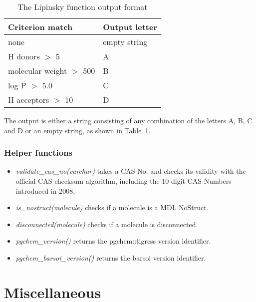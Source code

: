 \documentclass[a4paper]{article}
\begin{document}
\begin{table}[h]
\begin{tabular}{|l|l|}
\hline 
	\textbf{Criterion match} & \textbf{Output letter}\\
	\hline 
  none	& empty string\\
  \hline 
  H donors $>$ 5	& A\\
  \hline 
  molecular weight $>$ 500	& B\\
  \hline 
  log P $>$ 5.0	& C\\
  \hline 
  H acceptors $>$ 10	& D\\
  \hline 
\end{tabular}
\caption{The Lipinsky function output format}
\label{tbl:lipinsky_output}
\end{table}
The output is either a string consisting of any combination of the letters A, B, C and D or an empty string, as shown in Table~\ref{tbl:lipinsky_output}.

\section{Helper functions}
\begin{itemize}
\item\textit{validate\_cas\_no(varchar)} takes a CAS-No. and checks its validity with the official CAS checksum algorithm, including the 10 digit CAS-Numbers introduced in 2008.
\item\textit{is\_nostruct(molecule)} checks if a molecule is a MDL NoStruct.
\item\textit{disconnected(molecule)} checks if a molecule is disconnected.
\item\textit{pgchem\_version()} returns the pgchem::tigress version identifier.
\item\textit{pgchem\_barsoi\_version()} returns the barsoi version identifier.
\end{itemize}
\part{Miscellaneous}
\end{document}
